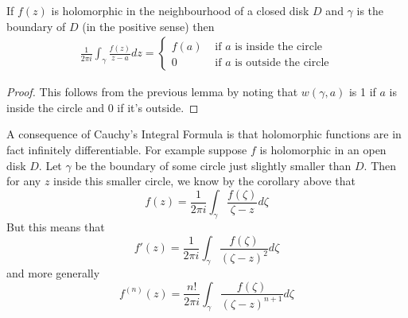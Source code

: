 \begin{corollary}
    If $f(z)$ is holomorphic in the neighbourhood of a closed disk $D$ and $\gamma$ is the boundary of $D$ (in the positive sense) then
    \begin{align*}
        \frac{1}{2\pi i} \int_\gamma \frac{f(z)}{z - a}dz =
        \begin{cases}
            f(a) &\text{ if $a$ is inside the circle}\\
            0 &\text{ if $a$ is outside the circle}
        \end{cases}
    \end{align*}
\end{corollary}
\begin{proof}
    This follows from the previous lemma by noting that $w(\gamma, a)$ is 1 if $a$ is inside the circle and $0$ if it's outside.
\end{proof}
A consequence of Cauchy's Integral Formula is that holomorphic functions are in fact infinitely differentiable. For example suppose $f$ is holomorphic in an open disk $D$. Let $\gamma$ be the boundary of some circle just slightly smaller than $D$. Then for any $z$ inside this smaller circle, we know by the corollary above that
$$ f(z) = \frac{1}{2\pi i} \int_{\gamma} \frac{f(\zeta)}{\zeta - z} d\zeta $$
But this means that
$$ f'(z) = \frac{1}{2\pi i} \int_\gamma \frac{f(\zeta)}{(\zeta - z)^2} d\zeta $$
and more generally
$$ f^{(n)}(z) = \frac{n!}{2\pi i} \int_\gamma \frac{f(\zeta)}{(\zeta - z)^{n + 1}} d\zeta $$


